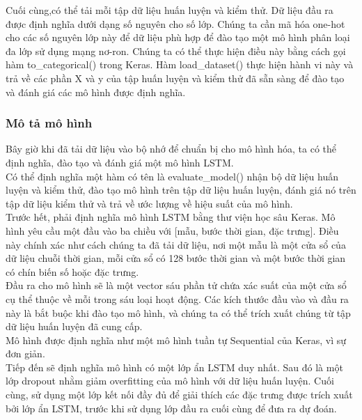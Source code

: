Cuối cùng,có thể tải mỗi tập dữ liệu huấn luyện và kiểm thử. Dữ liệu đầu ra được định nghĩa dưới dạng số nguyên cho số lớp. Chúng ta cần mã hóa one-hot cho các số nguyên lớp này để dữ liệu phù hợp để đào tạo một mô hình phân loại đa lớp sử dụng mạng nơ-ron. Chúng ta có thể thực hiện điều này bằng cách gọi hàm to\_categorical() trong Keras. Hàm load\_dataset() thực hiện hành vi này và trả về các phần X và y của tập huấn luyện và kiểm thử đã sẵn sàng để đào tạo và đánh giá các mô hình được định nghĩa.

\subsubsection{Mô tả mô hình}

Bây giờ khi đã tải dữ liệu vào bộ nhớ để chuẩn bị cho mô hình hóa, ta có thể định nghĩa, đào tạo và đánh giá một mô hình LSTM.\\

Có thể định nghĩa một hàm có tên là evaluate\_model() nhận bộ dữ liệu huấn luyện và kiểm thử, đào tạo mô hình trên tập dữ liệu huấn luyện, đánh giá nó trên tập dữ liệu kiểm thử và trả về ước lượng về hiệu suất của mô hình.\\

Trước hết, phải định nghĩa mô hình LSTM bằng thư viện học sâu Keras. Mô hình yêu cầu một đầu vào ba chiều với [mẫu, bước thời gian, đặc trưng]. Điều này chính xác như cách chúng ta đã tải dữ liệu, nơi một mẫu là một cửa sổ của dữ liệu chuỗi thời gian, mỗi cửa sổ có 128 bước thời gian và một bước thời gian có chín biến số hoặc đặc trưng.\\

Đầu ra cho mô hình sẽ là một vector sáu phần tử chứa xác suất của một cửa sổ cụ thể thuộc về mỗi trong sáu loại hoạt động. Các kích thước đầu vào và đầu ra này là bắt buộc khi đào tạo mô hình, và chúng ta có thể trích xuất chúng từ tập dữ liệu huấn luyện đã cung cấp.\\

Mô hình được định nghĩa như một mô hình tuần tự Sequential của Keras, vì sự đơn giản.\\

Tiếp đến sẽ định nghĩa mô hình có một lớp ẩn LSTM duy nhất. Sau đó là một lớp dropout nhằm giảm overfitting của mô hình với dữ liệu huấn luyện. Cuối cùng, sử dụng một lớp kết nối đầy đủ để giải thích các đặc trưng được trích xuất bởi lớp ẩn LSTM, trước khi sử dụng lớp đầu ra cuối cùng để đưa ra dự đoán.\\

